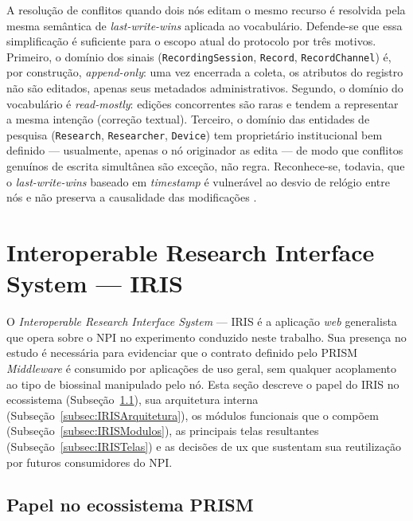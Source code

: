 A resolução de conflitos quando dois nós editam o mesmo recurso é resolvida pela mesma semântica de \textit{last-write-wins} aplicada ao vocabulário. Defende-se que essa simplificação é suficiente para o escopo atual do protocolo por três motivos. Primeiro, o domínio dos sinais (\texttt{RecordingSession}, \texttt{Record}, \texttt{RecordChannel}) é, por construção, \textit{append-only}: uma vez encerrada a coleta, os atributos do registro não são editados, apenas seus metadados administrativos. Segundo, o domínio do vocabulário é \textit{read-mostly}: edições concorrentes são raras e tendem a representar a mesma intenção (correção textual). Terceiro, o domínio das entidades de pesquisa (\texttt{Research}, \texttt{Researcher}, \texttt{Device}) tem proprietário institucional bem definido --- usualmente, apenas o nó originador as edita --- de modo que conflitos genuínos de escrita simultânea são exceção, não regra. Reconhece-se, todavia, que o \textit{last-write-wins} baseado em \textit{timestamp} é vulnerável ao desvio de relógio entre nós e não preserva a causalidade das modificações \cite{vogels2009eventually, kleppmann2017designing}.

\section{Interoperable Research Interface System --- IRIS}\label{sec:desenvolvimentoIRIS}

O \textit{Interoperable Research Interface System} --- IRIS \cite{prismIrisRepo} é a aplicação \textit{web} generalista que opera sobre o NPI no experimento conduzido neste trabalho. Sua presença no estudo é necessária para evidenciar que o contrato definido pelo PRISM \textit{Middleware} é consumido por aplicações de uso geral, sem qualquer acoplamento ao tipo de biossinal manipulado pelo nó. Esta seção descreve o papel do IRIS no ecossistema (Subseção~\ref{subsec:IRISPapel}), sua arquitetura interna (Subseção~\ref{subsec:IRISArquitetura}), os módulos funcionais que o compõem (Subseção~\ref{subsec:IRISModulos}), as principais telas resultantes (Subseção~\ref{subsec:IRISTelas}) e as decisões de \gls{ux} que sustentam sua reutilização por futuros consumidores do NPI.

\subsection{Papel no ecossistema PRISM}\label{subsec:IRISPapel}

